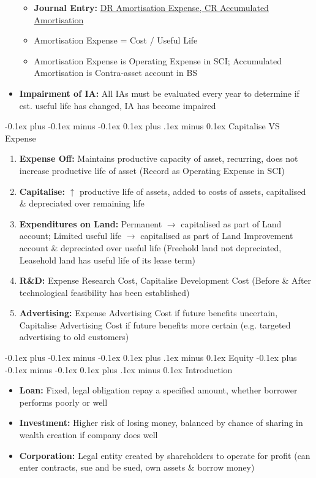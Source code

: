\documentclass[landscape]{article}
\makeatletter
\renewcommand{\section}{\@startsection{section}{1}{0mm}%
  {-0.1ex plus -0.1ex minus -0.1ex}%
  {0.1ex plus .1ex minus 0.1ex}%
{\normalfont\small\bfseries}}
\renewcommand{\subsection}{\@startsection{subsection}{2}{0mm}%
  {-0.1ex plus -0.1ex minus -0.1ex}%
  {0.1ex plus .1ex minus 0.1ex}%
{\normalfont\scriptsize\bfseries}}
\makeatother
\begin{document}
\begin{multicols}{6}
\begin{itemize}
\begin{itemize}
        \item \textbf{Journal Entry:} \underline{DR Amortisation Expense, CR Accumulated Amortisation}
        \item Amortisation Expense = Cost / Useful Life
        \item Amortisation Expense is Operating Expense in SCI; Accumulated Amortisation is Contra-asset account in BS
      \end{itemize}
      \item \textbf{Impairment of IA:} All IAs must be evaluated every year to determine if est. useful life has changed, IA has become impaired
    \end{itemize}

    \subsection{Capitalise VS Expense}
    \begin{enumerate}
      \item \textbf{Expense Off:} Maintains productive capacity of asset, recurring, does not increase productive life of asset (Record as Operating Expense in SCI)
      \item \textbf{Capitalise:} $\uparrow$ productive life of assets, added to costs of assets, capitalised \& depreciated over remaining life
      \item \textbf{Expenditures on Land:} Permanent $\rightarrow$ capitalised as part of Land account; Limited useful life $\rightarrow$ capitalised as part of Land Improvement account \& depreciated  over useful life (Freehold land not depreciated, Leasehold land has useful life of its lease term)
      \item \textbf{R\&D:} Expense Research Cost, Capitalise Development Cost (Before \& After technological feasibility has been established)
      \item \textbf{Advertising:} Expense Advertising Cost if future benefits uncertain, Capitalise Advertising Cost if future benefits more certain (e.g. targeted advertising to old customers)
    \end{enumerate}

    \section{Equity}
    \subsection{Introduction}
    \begin{itemize}
      \item \textbf{Loan:} Fixed, legal obligation repay a specified amount, whether borrower performs poorly or well
      \item \textbf{Investment:} Higher risk of losing money, balanced by chance of sharing in wealth creation if company does well
      \item \textbf{Corporation:} Legal entity created by shareholders to operate for profit (can enter contracts, sue and be sued, own assets \& borrow money)
    \end{itemize}


\end{multicols}
\end{document}
